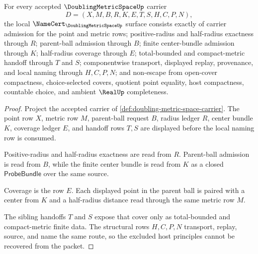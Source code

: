 \begin{theorem}
\label{thm:doubling-metric-space-namecert-obligations}
For every accepted $\DoublingMetricSpaceUp$ carrier
$$
D=(X,M,B,R,K,E,T,S,H,C,P,N),
$$
the local $\NameCert_{\DoublingMetricSpaceUp}$ surface consists exactly of carrier admission for the point and metric rows; positive-radius and half-radius exactness through $R$; parent-ball admission through $B$; finite center-bundle admission through $K$; half-radius coverage through $E$; total-bounded and compact-metric handoff through $T$ and $S$; componentwise transport, displayed replay, provenance, and local naming through $H,C,P,N$; and non-escape from open-cover compactness, choice-selected covers, quotient point equality, host compactness, countable choice, and ambient $\RealUp$ completeness.
\end{theorem}
\begin{proof}
Project the accepted carrier of \autoref{def:doubling-metric-space-carrier}. The point row $X$, metric row $M$, parent-ball request $B$, radius ledger $R$, center bundle $K$, coverage ledger $E$, and handoff rows $T,S$ are displayed before the local naming row is consumed.

Positive-radius and half-radius exactness are read from $R$. Parent-ball admission is read from $B$, while the finite center bundle is read from $K$ as a closed $\mathsf{ProbeBundle}$ over the same source.

Coverage is the row $E$. Each displayed point in the parent ball is paired with a center from $K$ and a half-radius distance read through the same metric row $M$.

The sibling handoffs $T$ and $S$ expose that cover only as total-bounded and compact-metric finite data. The structural rows $H,C,P,N$ transport, replay, source, and name the same route, so the excluded host principles cannot be recovered from the packet.
\end{proof}

